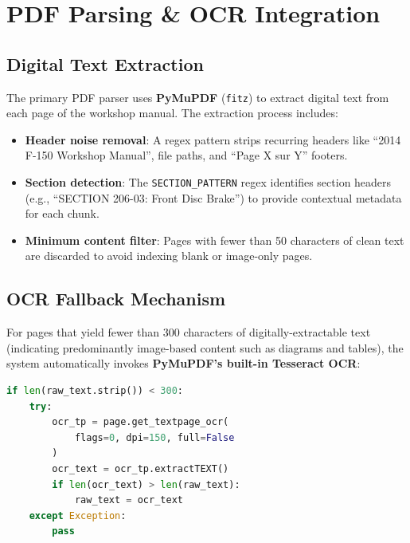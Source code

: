 \documentclass[12pt, a4paper]{article}
\begin{document}
\section{PDF Parsing \& OCR Integration}

\subsection{Digital Text Extraction}

The primary PDF parser uses \textbf{PyMuPDF} (\texttt{fitz}) to extract digital text from each page of the workshop manual. The extraction process includes:

\begin{itemize}[itemsep=2pt]
  \item \textbf{Header noise removal}: A regex pattern strips recurring headers like ``2014 F-150 Workshop Manual'', file paths, and ``Page X sur Y'' footers.
  \item \textbf{Section detection}: The \texttt{SECTION\_PATTERN} regex identifies section headers (e.g., ``SECTION 206-03: Front Disc Brake'') to provide contextual metadata for each chunk.
  \item \textbf{Minimum content filter}: Pages with fewer than 50 characters of clean text are discarded to avoid indexing blank or image-only pages.
\end{itemize}

\subsection{OCR Fallback Mechanism}

For pages that yield fewer than 300 characters of digitally-extractable text (indicating predominantly image-based content such as diagrams and tables), the system automatically invokes \textbf{PyMuPDF's built-in Tesseract OCR}:

\begin{lstlisting}[language=Python, caption={OCR fallback in \texttt{pdf\_parser.py}}]
if len(raw_text.strip()) < 300:
    try:
        ocr_tp = page.get_textpage_ocr(
            flags=0, dpi=150, full=False
        )
        ocr_text = ocr_tp.extractTEXT()
        if len(ocr_text) > len(raw_text):
            raw_text = ocr_text
    except Exception:
        pass
\end{lstlisting}
\end{document}
